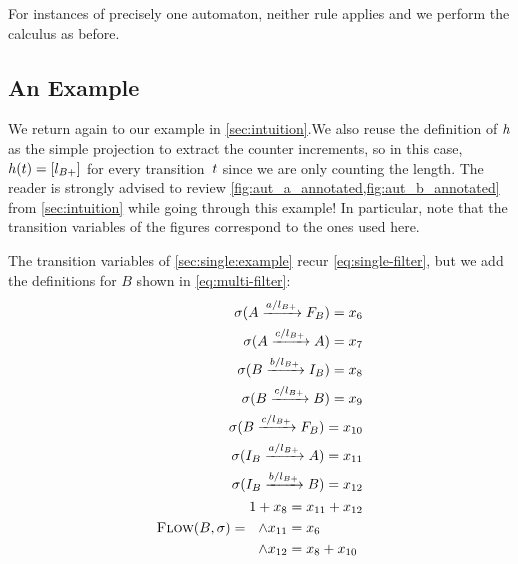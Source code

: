 \iffalse
Note that this definition implies that $\Filter(\Transition) =
\Filter(\Transition')$ whenever two transitions $\Transition \in
\Transitions_{\Automaton_1}, \Transition' \in \Transitions_{\Automaton_2}$
produces a product transition $\Transition'' \in \Transitions_{\Automaton_1
\times \Automaton_2}$. This corresponds to our intuition that the terms of the
product must agree on the value they accept. As before, we implicitly map
$\Filter$ to fresh terms for each transition in the product.
\fi

For instances of precisely one automaton, neither rule applies and we
perform the calculus as before.

\subsection{An Example}\label{sec:multiple:example}

We return again to our example in \cref{sec:intuition}.We also reuse the
definition of $h$ as the simple projection to extract the counter increments,
so in this case, $h(t) = \left[l_{B+}\right]$ for every
transition~$t$ since we are only counting the length. The reader is
strongly advised to review \cref{fig:aut_a_annotated,fig:aut_b_annotated} from
\cref{sec:intuition} while going through this example! In particular, note that
the transition variables of the figures correspond to the ones used here.

The transition variables of \cref{sec:single:example} recur
\cref{eq:single-filter}, but we add the definitions for $B$ shown in
\cref{eq:multi-filter}:
\begin{equation}\label{eq:multi-filter}
    \begin{aligned}
        \operatorname{\sigma}(A \xrightarrow{a / l_{B+}} F_B ) = x_6\\
        \operatorname{\sigma}(A \xrightarrow{c / l_{B+}} A ) = x_7\\
        \operatorname{\sigma}(B \xrightarrow{b / l_{B+}} I_B)= x_8 \\
        \operatorname{\sigma}(B \xrightarrow{c / l_{B+}} B)= x_9\\
        \operatorname{\sigma}(B \xrightarrow{c / l_{B+}} F_B)= x_{10}\\
        \operatorname{\sigma}(I_B \xrightarrow{a / l_{B+}} A)= x_{11}\\
        \operatorname{\sigma}(I_B \xrightarrow{b / l_{B+}} B)= x_{12}\\
        \textsc{Flow}(B, \operatorname{\sigma}) =  \begin{aligned}
            1 + x_{8}   &= x_{11} + x_{12}\\
            \land x_{11} &= x_6\\
            \land x_{12} &= x_8 + x_{10}
        \end{aligned}
    \end{aligned}
\end{equation}


